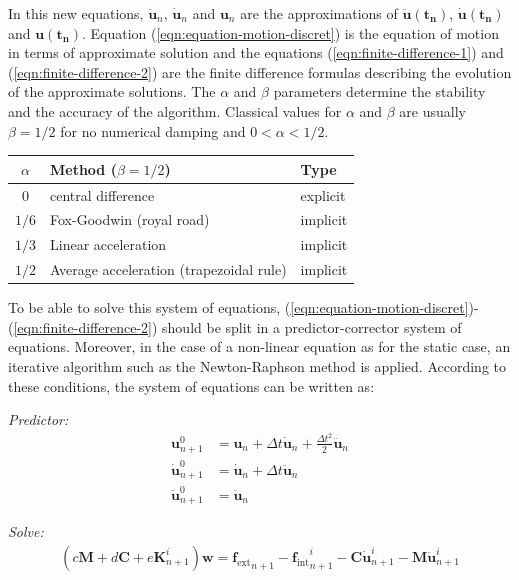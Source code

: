 \documentclass[a4paper,11pt]{book}
\renewcommand{\vec}[1]{\ensuremath{\boldsymbol{#1}}}
\newcommand{\mat}[1]{\ensuremath{\boldsymbol{#1}}}
\newcommand{\st}[1]{{\mathrm{#1}}}
\begin{document}
In   this   new   equations,   $\vec{\ddot{u}}_{n}$,   $\vec{\dot{u}}_{n}$   and
$\vec{u}_{n}$     are    the     approximations     of    $\vec{\ddot{u}(t_n)}$,
$\vec{\dot{u}(t_n)}$           and           $\vec{u(t_n)}$.            Equation
(\ref{eqn:equation-motion-discret})  is  the  equation  of motion  in  terms  of
approximate  solution  and  the  equations  (\ref{eqn:finite-difference-1})  and
(\ref{eqn:finite-difference-2})  are the  finite difference  formulas describing
the evolution of the approximate solutions.  The $\alpha$ and $\beta$ parameters
determine the stability and the  accuracy of the algorithm. Classical values for
$\alpha$ and $\beta$ are usually $\beta = 1/2$ for no numerical damping and $0 <
\alpha < 1/2$.

\begin{center}
  \begin{tabular}{cll}
    \toprule
    $\alpha$ & Method ($\beta = 1/2$) & Type\\
    \midrule
    $0$ & central difference & explicit\\
    $1/6$ & Fox-Goodwin (royal road) &implicit\\
    $1/3$ & Linear acceleration &implicit\\
    $1/2$ & Average acceleration (trapezoidal rule)& implicit\\
    \bottomrule
  \end{tabular}
\end{center}

To     be      able     to      solve     this     system      of     equations,
(\ref{eqn:equation-motion-discret})-(\ref{eqn:finite-difference-2})   should  be
split in a predictor-corrector system of  equations.  Moreover, in the case of a
non-linear equation as  for the static case, an iterative  algorithm such as the
Newton-Raphson method is applied.  According  to these conditions, the system of
equations can be written as:

\noindent\textit{Predictor:}
\begin{align}
  \vec{u}_{n+1}^{0} &=  \vec{u}_{n} +  \Delta t \vec{\dot{u}}_{n}  + \frac{\Delta
    t^2}{2} \vec{\ddot{u}}_{n} \\
  \vec{\dot{u}}_{n+1}^{0}  &= \vec{\dot{u}}_{n} +  \Delta t \vec{\ddot{u}}_{n} \\
  \vec{\ddot{u}}_{n+1}^{0} &= \vec{\ddot{u}}_{n}
\end{align}

\noindent\textit{Solve:}
\begin{align}
  \left(c \mat{M} + d \mat{C}  + e \mat{K}_{n+1}^i\right) \vec{w} = \vec{f_{\st{ext}}}_{n+1} -
  \vec{f_{\st{int}}}_{n+1}^i    -   \mat{C}    \vec{\dot{u}}_{n+1}^i    -   \mat{M}
  \vec{\ddot{u}}_{n+1}^i
\end{align}
\end{document}
